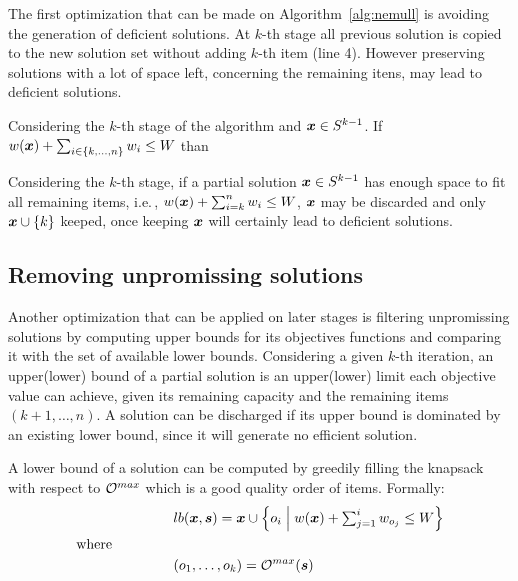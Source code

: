 The first optimization that can be made on Algorithm~\ref{alg:nemull} is
avoiding the generation of deficient solutions.
At $k$-th stage all previous solution is copied to the
new solution set without adding $k$-th item (line 4).
However preserving solutions with a lot of space left, concerning the remaining itens,
may lead to deficient solutions.

\begin{theorem}
   Considering the $k$-th stage of the algorithm and $\boldsymbol{x} \in S^{k-1}$.
   If $w(\boldsymbol{x}) + \sum_{i \in {\{k, \ldots, n\}}} w_i \leq W$ than
\end{theorem}

Considering the $k$-th stage, if a partial solution $\boldsymbol{x} \in S^{k-1}$ has enough
space to fit all remaining items, i.e.\,, $w(\boldsymbol{x}) + \sum_{i=k}^n w_i \leq W$,
$\boldsymbol{x}$ may be discarded and only $\boldsymbol{x} \cup \{k\}$ keeped, once
keeping $\boldsymbol{x}$ will certainly lead to deficient solutions.

\subsection{Removing unpromissing solutions}

Another optimization that can be applied on later stages is
filtering unpromissing solutions by computing upper bounds for its objectives
functions and comparing it with the set of available lower bounds.
Considering a given $k$-th iteration, an upper(lower) bound of a partial solution
is an upper(lower) limit each objective value can achieve,
given its remaining capacity and the remaining items $(k+1, \ldots, n)$.
A solution can be discharged if its upper bound is dominated by an existing lower bound, since it will generate no efficient solution.

A lower bound of a solution can be computed by greedily filling the
knapsack with respect to $\mathcal{O}^{max}$ which is a good quality order of items.
Formally:
\begin{align*}
    &lb(\boldsymbol{x}, \boldsymbol{s}) = \boldsymbol{x} \cup
      \left\{ o_i \;\middle|\; w(\boldsymbol{x}) + \textstyle\sum_{j=1}^i w_{o_j} \leq W \right\} \\
  \text{where} \phantom{mmmmm} \\
    &(o_1, \ldots, o_k) = \mathcal{O}^{max}(\boldsymbol{s}) \\
\end{align*}

